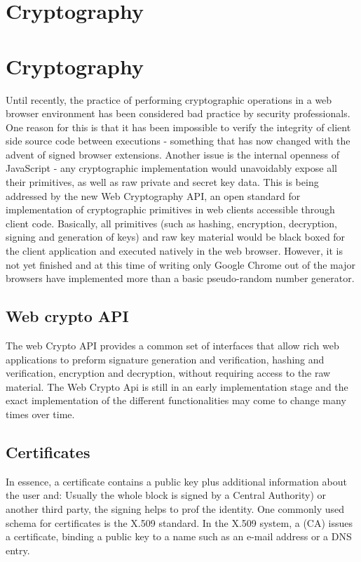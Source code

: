 \section{Cryptography}
\section{Cryptography}
Until recently, the practice of performing cryptographic operations in a web browser environment has been considered bad practice by security professionals\cite{Matasano:Online}. One reason for this is that it has been impossible to verify the integrity of client side source code between executions - something that has now changed with the advent of signed browser extensions. Another issue is the internal openness of JavaScript - any cryptographic implementation would unavoidably expose all their primitives, as well as raw private and secret key data. This is being addressed by the new Web Cryptography API\cite{WebCrypto:Online}, an open standard for implementation of cryptographic primitives in web clients accessible through client code. Basically, all primitives (such as hashing, encryption, decryption, signing and generation of keys) and raw key material would be black boxed for the client application and executed natively in the web browser. However, it is not yet finished and at this time of writing only Google Chrome out of the major browsers have implemented more than a basic pseudo-random number generator.

\subsection{Web crypto API}
The web Crypto API provides a common set of interfaces that allow rich web applications to preform signature generation and verification, hashing and verification, encryption and decryption, without requiring access to the raw material. The Web Crypto Api is still in an early implementation stage and the exact implementation of the different functionalities may come to change many times over time.



\subsection{Certificates} %
In essence, a certificate contains a public key plus additional information about the user and: Usually the whole block is signed by a Central Authority) or another third party, the signing helps to prof the identity.
One commonly used schema for certificates is the X.509 standard. In the X.509 system, a (CA) issues a certificate, binding a public key to a name such as an e-mail address or a DNS entry.

